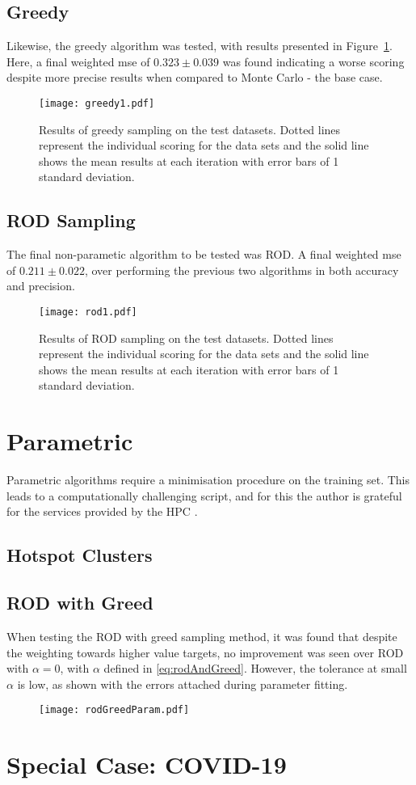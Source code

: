 \subsection{Greedy}
Likewise, the greedy algorithm was tested, with results presented in Figure~\ref{fig:GreedyTestSet}. Here, a final weighted mse of ${0.323\pm{}0.039}$ was found indicating a worse scoring despite more precise results when compared to Monte Carlo - the base case.
\begin{figure}[h]
    \begin{center}
        \texttt{[image: greedy1.pdf]}
        \caption[Greedy]{Results of greedy sampling on the test datasets. Dotted lines represent the individual scoring for the data sets and the solid line shows the mean results at each iteration with error bars of 1 standard deviation.}
        \label{fig:GreedyTestSet}
    \end{center}
\end{figure}

\subsection{ROD Sampling}
The final non-parametic algorithm to be tested was ROD. A final weighted mse of ${0.211\pm{}0.022}$, over performing the previous two algorithms in both accuracy and precision.

\begin{figure}[h]
    \begin{center}
        \texttt{[image: rod1.pdf]}
        \caption[ROD]{Results of ROD sampling on the test datasets. Dotted lines represent the individual scoring for the data sets and the solid line shows the mean results at each iteration with error bars of 1 standard deviation.}
        \label{fig:RODTestSet}
    \end{center}
\end{figure}

\section{Parametric}
Parametric algorithms require a minimisation procedure on the training set. This leads to a computationally challenging script, and for this the author is grateful for the services provided by the HPC \cite{HPC}.
\subsection{Hotspot Clusters}
\blindtext[1]
\subsection{ROD with Greed}
When testing the ROD with greed sampling method, it was found that despite the weighting towards higher value targets, no improvement was seen over ROD with $\alpha{}=0$, with $\alpha$ defined in \ref{eq:rodAndGreed}. However, the tolerance at small $\alpha$ is low, as shown with the errors attached during parameter fitting.

\begin{figure}[h]
    \begin{center}
        \texttt{[image: rodGreedParam.pdf]}
    \end{center}
\end{figure}

\section{Special Case: COVID-19}